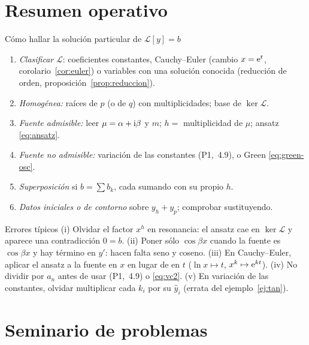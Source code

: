 \documentclass[11pt,twoside]{article}
\newcommand\Lop{\mathcal L}
\newcommand\yh{\hat y}
\newcommand\pI[1]{(P1,~#1)}
\begin{document}
\section{Resumen operativo}\label{sec:resumen}

\begin{metodo}{Cómo hallar la solución particular de $\Lop[y]=b$}
\begin{enumerate}
\item \emph{Clasificar} $\Lop$: coeficientes constantes, Cauchy--Euler (cambio $x=\mathrm{e}^t$, corolario~\ref{cor:euler}) o
variables con una solución conocida (reducción de orden, proposición~\ref{prop:reduccion}).
\item \emph{Homogénea:} raíces de $p$ (o de $q$) con multiplicidades; base de $\ker\Lop$.
\item \emph{Fuente admisible:} leer $\mu=\alpha+\mathrm{i}\beta$ y $m$; $h=$ multiplicidad de $\mu$; ansatz \eqref{eq:ansatz}.
\item \emph{Fuente no admisible:} variación de las constantes \pI{4.9}, o Green \eqref{eq:green-osc}.
\item \emph{Superposición} si $b=\sum b_k$, cada sumando con su propio $h$.
\item \emph{Datos iniciales o de contorno} sobre $y_h+y_p$; comprobar sustituyendo.
\end{enumerate}
\end{metodo}

\begin{nota}{Errores típicos}
(i) Olvidar el factor $x^h$ en resonancia: el ansatz cae en $\ker\Lop$ y aparece una contradicción $0=b$.
(ii) Poner sólo $\cos\beta x$ cuando la fuente es $\cos\beta x$ y hay término en $y'$: hacen falta seno y coseno.
(iii) En Cauchy--Euler, aplicar el ansatz a la fuente en $x$ en lugar de en $t$ ($\ln x\mapsto t$, $x^k\mapsto\mathrm{e}^{kt}$).
(iv) No dividir por $a_n$ antes de usar \pI{4.9} o \eqref{eq:vc2}.
(v) En variación de las constantes, olvidar multiplicar cada $k_i$ por su $\yh_i$ (errata del ejemplo~\ref{ej:tan}).
\end{nota}

\section{Seminario de problemas}\label{sec:seminario}
\end{document}
